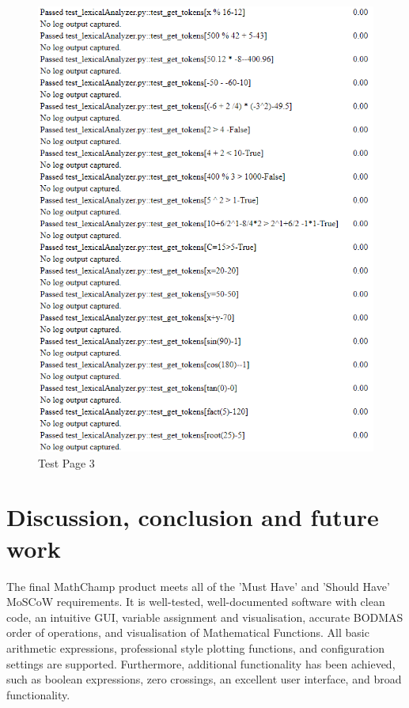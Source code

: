 \documentclass[a4paper, oneside, 11pt]{report}
\begin{document}
\begin{figure}[H]
    \centering
    \includegraphics[width=15cm]{pytest 3.png}
    \caption{Test Page 3}
    \label{fig:pytest3}
\end{figure}



\chapter{Discussion, conclusion and future work}\label{Conclusions}

The final MathChamp product meets all of the 'Must Have' and 'Should Have' MoSCoW requirements. It is well-tested, well-documented software with clean code, an intuitive GUI, variable assignment and visualisation, accurate BODMAS order of operations, and visualisation of Mathematical Functions. All basic arithmetic expressions, professional style plotting functions, and configuration settings are supported. Furthermore, additional functionality has been achieved, such as boolean expressions, zero crossings, an excellent user interface, and broad functionality.
\end{document}
